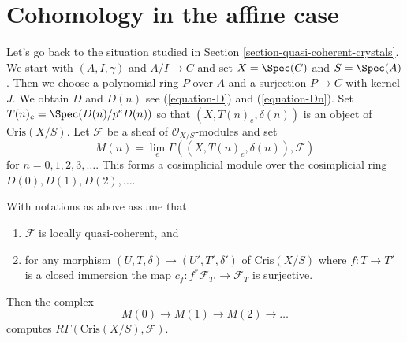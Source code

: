 \section{Cohomology in the affine case}
\label{section-cohomology-affine}

\noindent
Let's go back to the situation studied in
Section \ref{section-quasi-coherent-crystals}. We
start with $(A, I, \gamma)$ and $A/I \to C$ and set
$X = \Spec(C)$ and $S = \Spec(A)$. Then we choose
a polynomial ring $P$ over $A$ and a surjection $P \to C$ with
kernel $J$. We obtain $D$ and $D(n)$ see
(\ref{equation-D}) and (\ref{equation-Dn}).
Set $T(n)_e = \Spec(D(n)/p^eD(n))$ so that
$(X, T(n)_e, \delta(n))$ is an object of $\text{Cris}(X/S)$.
Let $\mathcal{F}$ be a sheaf of $\mathcal{O}_{X/S}$-modules and set
$$
M(n) = \lim_e \Gamma((X, T(n)_e, \delta(n)), \mathcal{F})
$$
for $n = 0, 1, 2, 3, \ldots$. This forms a cosimplicial module
over the cosimplicial ring $D(0), D(1), D(2), \ldots$.

\begin{proposition}
\label{proposition-compute-cohomology}
With notations as above assume that
\begin{enumerate}
\item $\mathcal{F}$ is locally quasi-coherent, and
\item for any morphism $(U, T, \delta) \to (U', T', \delta')$
of $\text{Cris}(X/S)$ where $f : T \to T'$ is a closed immersion
the map $c_f : f^*\mathcal{F}_{T'} \to \mathcal{F}_T$ is surjective.
\end{enumerate}
Then the complex
$$
M(0) \to M(1) \to M(2) \to \ldots
$$
computes $R\Gamma(\text{Cris}(X/S), \mathcal{F})$.
\end{proposition}

